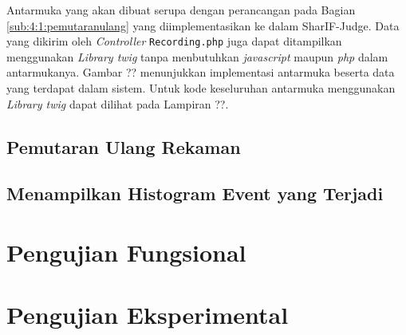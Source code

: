 Antarmuka yang akan dibuat serupa dengan perancangan pada Bagian \ref{sub:4:1:pemutaranulang} yang diimplementasikan ke dalam SharIF-Judge. Data yang dikirim oleh \textit{Controller} \verb|Recording.php| juga dapat ditampilkan menggunakan \textit{Library twig} tanpa menbutuhkan \textit{javascript} maupun \textit{php} dalam antarmukanya. Gambar ?? menunjukkan implementasi antarmuka beserta data yang terdapat dalam sistem. Untuk kode keseluruhan antarmuka menggunakan \textit{Library twig} dapat dilihat pada Lampiran ??.

\subsection{Pemutaran Ulang Rekaman}

\subsection{Menampilkan Histogram Event yang Terjadi}


\section{Pengujian Fungsional}
\label{sec:5:fungsional}

\section{Pengujian Eksperimental}
\label{sec:5:eksperimental}